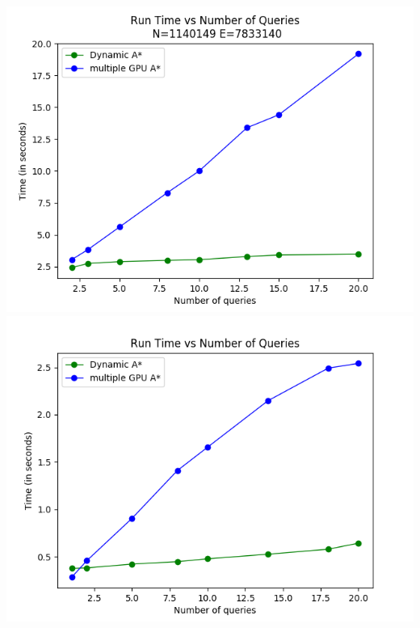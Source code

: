 \documentclass[a4paper]{article}
\begin{document}
\begin{center}
\includegraphics[scale=0.36]{img/TvQ_wikitalk.png}        
\includegraphics[scale=0.36]{img/QvT_dyn.png} 
\end{center}
\end{document}
